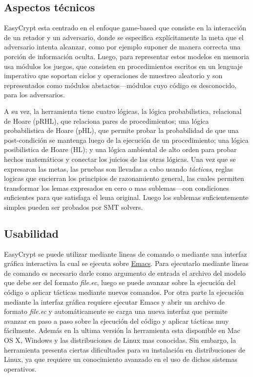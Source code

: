 \documentclass[runningheads]{llncs}
\begin{document}
\subsection{Aspectos técnicos}

EasyCrypt esta centrado en el enfoque game-based que consiste en la interacción de un retador y un adversario, donde se especifica explícitamente la meta que el adversario intenta alcanzar, como por ejemplo suponer de manera correcta una porción de información oculta. Luego, para representar estos modelos en memoria usa módulos los juegos, que consisten en procedimientos escritos en un lenguaje imperativo que soportan ciclos y operaciones de muestreo aleatorio y son representados como módulos abstactos—módulos cuyo código es desconocido, para los adversarios.

A su vez, la herramienta tiene cuatro lógicas, la lógica probabilistica, relacional de Hoare (pRHL), que relaciona pares de procedimientos; una lógica probabilistica de Hoare (pHL), que permite probar la probabilidad de que una post-condición se mantenga luego de la ejecución de un procedimiento; una lógica posibilistica de Hoare (HL); y una lógica ambiental de alto orden para probar hechos matemáticos y conectar los juicios de las otras lógicas. Una vez que se expresaron las metas, las pruebas son llevadas a cabo usando \textit{tácticas}, reglas logicas que encierran los principios de razonamiento general, las cuales permiten transformar los lemas expresados en cero o mas sublemas—con condiciones suficientes para que satisfaga el lema original. Luego los sublemas suficientemente simples pueden ser probados por SMT solvers.

\subsection{Usabilidad}
EasyCrypt se puede utilizar mediante lineas de comando o mediante una interfaz gráfica interactiva la cual se ejecuta sobre \href{https://www.gnu.org/software/emacs/}{Emacs}. Para ejecutarlo mediante lineas de comando es necesario darle como argumento de entrada el archivo del modelo que debe ser del formato \textit{file.ec}, luego se puede avanzar sobre la ejecución del código o aplicar tácticas mediante nuevos comandos. Por otra parte la ejecución mediante la interfaz gráfica requiere ejecutar Emacs y abrir un archivo de formato \textit{file.ec} y automáticamente se carga una nueva interfaz que permite avanzar en paso a paso sobre la ejecución del código y aplicar tácticas muy fácilmente. Además en la ultima versión la herramienta esta disponible en Mac OS X, Windows y las distribuciones de Linux mas conocidas. Sin embargo, la herramienta presenta ciertas dificultades para su instalación en distribuciones de Linux, ya que requiere un conocimiento avanzado en el uso de dichos sistemas operativos.
\end{document}
